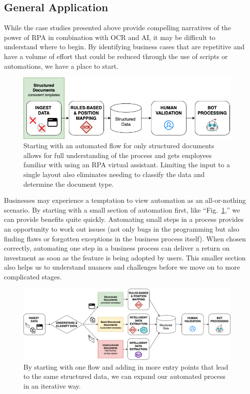 \documentclass[conference]{IEEEtran}
\begin{document}
\subsection{General Application}
While the case studies presented above provide compelling narratives of the power of RPA in combination with OCR and AI, it may be difficult to understand where to begin. By identifying business cases that are repetitive and have a volume of effort that could be reduced through the use of scripts or automations, we have a place to start.

\begin{figure}[ht]
\centerline{\includegraphics[width=\columnwidth]{USE CASE - 1 - STRUCTURED.png}}
\caption{Starting with an automated flow for only structured documents allows for full understanding of the process and gets employees familiar with using an RPA virtual assistant. Limiting the input to a single layout also eliminates needing to classify the data and determine the document type.}
\label{figUseCase1}
\end{figure}

Businesses may experience a temptation to view automation as an all-or-nothing scenario. By starting with a small section of automation first, like ``Fig.~\ref{figUseCase1},'' we can provide benefits quite quickly. Automating small steps in a process provides an opportunity to work out issues (not only bugs in the programming but also finding flaws or forgotten exceptions in the business process itself). When chosen correctly, automating one step in a business process can deliver a return on investment as soon as the feature is being adopted by users. This smaller section also helps us to understand nuances and challenges before we move on to more complicated stages.

\begin{figure}[ht]
\centerline{\includegraphics[width=\columnwidth]{USE CASE - 4 - ALL.png}}
\caption{By starting with one flow and adding in more entry points that lead to the same structured data, we can expand our automated process in an iterative way.}
\label{figUseCase4}
\end{figure}
\end{document}
